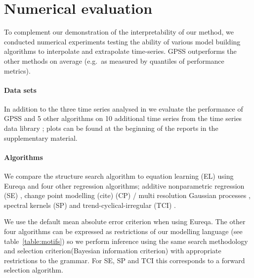 \documentclass{article}
\def\eg{e.g.\ }
\begin{document}
\section{Numerical evaluation}
\label{sec:numerical}

To complement our demonstration of the interpretability of our method, we conducted numerical experiments testing the ability of various model building algorithms to interpolate and extrapolate time-series.
GPSS outperforms the other methods on average (\eg as measured by quantiles of performance metrics).

\paragraph{Data sets}

In addition to the three time series analysed in \cite{DuvLloGroetal13} we evaluate the performance of GPSS and 5 other algorithms on 10 additional time series from the time series data library \citep{TSDL}; plots can be found at the beginning of the reports in the supplementary material.

\paragraph{Algorithms}

We compare the structure search algorithm to equation learning (EL) using Eureqa \citep{Eureqa} and four other regression algorithms; additive nonparametric regression (SE) \citep[e.g.][]{buja1989linear}, change point modelling (cite) (CP) / multi resolution Gaussian processes \citep[e.g.][]{garnett2010sequential, FoxDunson:NIPS2012}, spectral kernels (SP) \citep{WilAda13} and trend-cyclical-irregular (TCI) \citep[e.g.][]{lind2006basic}.

We use the default mean absolute error criterion when using Eureqa.
The other four algorithms can be expressed as restrictions of our modelling language (see table~\ref{table:motifs}) so we perform inference using the same search methodology and selection criterion\footnotemark (Bayesian information criterion) with appropriate restrictions to the grammar.
For SE, SP and TCI this corresponds to a forward selection algorithm.
\end{document}
